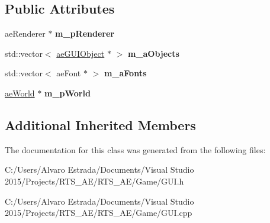 \subsection*{Public Attributes}
\begin{DoxyCompactItemize}
\item 
ae\+Renderer $\ast$ {\bfseries m\+\_\+p\+Renderer}\hypertarget{classae_g_u_i_a63bfd3a8296c30f6b91a587214177ff7}{}\label{classae_g_u_i_a63bfd3a8296c30f6b91a587214177ff7}

\item 
std\+::vector$<$ \hyperlink{classae_g_u_i_object}{ae\+G\+U\+I\+Object} $\ast$ $>$ {\bfseries m\+\_\+a\+Objects}\hypertarget{classae_g_u_i_ae8c3cc8768800ff751fdba7e0ec5533a}{}\label{classae_g_u_i_ae8c3cc8768800ff751fdba7e0ec5533a}

\item 
std\+::vector$<$ ae\+Font $\ast$ $>$ {\bfseries m\+\_\+a\+Fonts}\hypertarget{classae_g_u_i_acfb4bf30b10845e4f7cfea24d15c95bf}{}\label{classae_g_u_i_acfb4bf30b10845e4f7cfea24d15c95bf}

\item 
\hyperlink{classae_world}{ae\+World} $\ast$ {\bfseries m\+\_\+p\+World}\hypertarget{classae_g_u_i_a7f8b3352867f46093ff86c53b8ff7892}{}\label{classae_g_u_i_a7f8b3352867f46093ff86c53b8ff7892}

\end{DoxyCompactItemize}
\subsection*{Additional Inherited Members}


The documentation for this class was generated from the following files\+:\begin{DoxyCompactItemize}
\item 
C\+:/\+Users/\+Alvaro Estrada/\+Documents/\+Visual Studio 2015/\+Projects/\+R\+T\+S\+\_\+\+A\+E/\+R\+T\+S\+\_\+\+A\+E/\+Game/G\+U\+I.\+h\item 
C\+:/\+Users/\+Alvaro Estrada/\+Documents/\+Visual Studio 2015/\+Projects/\+R\+T\+S\+\_\+\+A\+E/\+R\+T\+S\+\_\+\+A\+E/\+Game/G\+U\+I.\+cpp\end{DoxyCompactItemize}
